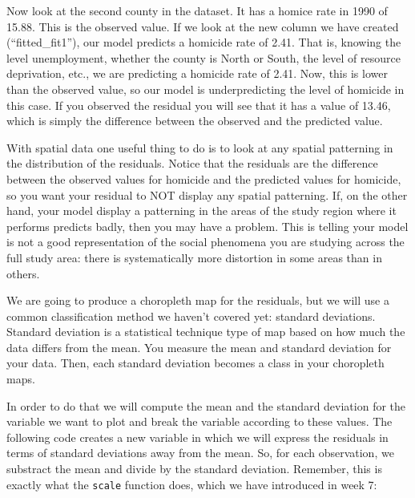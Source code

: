 \documentclass[]{book}
\newenvironment{Shaded}{\begin{snugshade}}{\end{snugshade}}
\newcommand{\CommentTok}[1]{\textcolor[rgb]{0.56,0.35,0.01}{\textit{#1}}}
\newcommand{\DecValTok}[1]{\textcolor[rgb]{0.00,0.00,0.81}{#1}}
\newcommand{\KeywordTok}[1]{\textcolor[rgb]{0.13,0.29,0.53}{\textbf{#1}}}
\newcommand{\NormalTok}[1]{#1}
\newcommand{\OperatorTok}[1]{\textcolor[rgb]{0.81,0.36,0.00}{\textbf{#1}}}
\newcommand{\StringTok}[1]{\textcolor[rgb]{0.31,0.60,0.02}{#1}}
\begin{document}
Now look at the second county in the dataset. It has a homice rate in 1990 of 15.88. This is the observed value. If we look at the new column we have created (``fitted\_fit1''), our model predicts a homicide rate of 2.41. That is, knowing the level unemployment, whether the county is North or South, the level of resource deprivation, etc., we are predicting a homicide rate of 2.41. Now, this is lower than the observed value, so our model is underpredicting the level of homicide in this case. If you observed the residual you will see that it has a value of 13.46, which is simply the difference between the observed and the predicted value.

With spatial data one useful thing to do is to look at any spatial patterning in the distribution of the residuals. Notice that the residuals are the difference between the observed values for homicide and the predicted values for homicide, so you want your residual to NOT display any spatial patterning. If, on the other hand, your model display a patterning in the areas of the study region where it performs predicts badly, then you may have a problem. This is telling your model is not a good representation of the social phenomena you are studying across the full study area: there is systematically more distortion in some areas than in others.

We are going to produce a choropleth map for the residuals, but we will use a common classification method we haven't covered yet: standard deviations. Standard deviation is a statistical technique type of map based on how much the data differs from the mean. You measure the mean and standard deviation for your data. Then, each standard deviation becomes a class in your choropleth maps.

In order to do that we will compute the mean and the standard deviation for the variable we want to plot and break the variable according to these values. The following code creates a new variable in which we will express the residuals in terms of standard deviations away from the mean. So, for each observation, we substract the mean and divide by the standard deviation. Remember, this is exactly what the \texttt{scale} function does, which we have introduced in week 7:

\begin{Shaded}
\end{Shaded}
\end{document}
